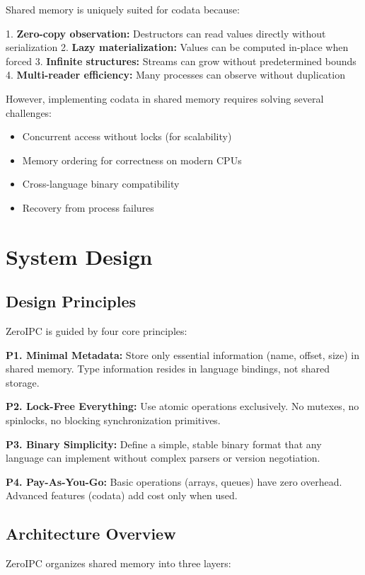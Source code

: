 \documentclass[letterpaper,twocolumn,10pt]{article}
\newcommand{\projectname}{ZeroIPC}
\begin{document}
Shared memory is uniquely suited for codata because:

1. \textbf{Zero-copy observation:} Destructors can read values directly without serialization
2. \textbf{Lazy materialization:} Values can be computed in-place when forced
3. \textbf{Infinite structures:} Streams can grow without predetermined bounds
4. \textbf{Multi-reader efficiency:} Many processes can observe without duplication

However, implementing codata in shared memory requires solving several challenges:
\begin{itemize}
\item Concurrent access without locks (for scalability)
\item Memory ordering for correctness on modern CPUs
\item Cross-language binary compatibility
\item Recovery from process failures
\end{itemize}

\section{System Design}

\subsection{Design Principles}

\projectname{} is guided by four core principles:

\textbf{P1. Minimal Metadata:} Store only essential information (name, offset, size) in shared memory. Type information resides in language bindings, not shared storage.

\textbf{P2. Lock-Free Everything:} Use atomic operations exclusively. No mutexes, no spinlocks, no blocking synchronization primitives.

\textbf{P3. Binary Simplicity:} Define a simple, stable binary format that any language can implement without complex parsers or version negotiation.

\textbf{P4. Pay-As-You-Go:} Basic operations (arrays, queues) have zero overhead. Advanced features (codata) add cost only when used.

\subsection{Architecture Overview}

\projectname{} organizes shared memory into three layers:
\end{document}
